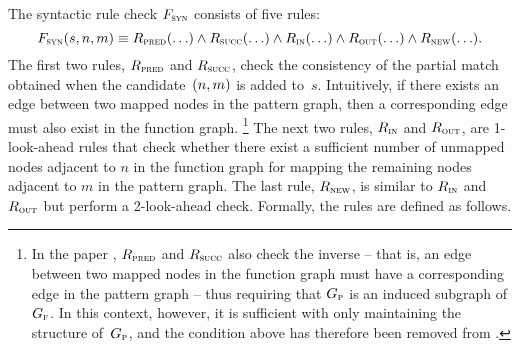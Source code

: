 The syntactic rule check $F_{\textrm{\textsc{syn}}}$ consists of five rules:
%
\begin{equation}
  F_{\textrm{\textsc{syn}}}(s, n, m) \equiv
  R_{\textrm{\textsc{pred}}}(\ldots) \wedge R_{\textrm{\textsc{succ}}}(\ldots) \wedge
  R_{\textrm{\textsc{in}}}(\ldots) \wedge R_{\textrm{\textsc{out}}}(\ldots) \wedge R_{\textrm{\textsc{new}}}(\ldots).
\end{equation}
%
The first two rules, $R_{\textrm{\textsc{pred}}}$ and $R_{\textrm{\textsc{succ}}}$, check the consistency
of the partial \gls{match} obtained when the candidate~\mbox{$\mPair{n}{m}$} is
added to~$s$.
%
Intuitively, if there exists an \gls{edge} between two mapped \glspl{node} in
the \gls{pattern graph}, then a corresponding \gls{edge} must also exist in the
\gls{function graph}.\!%
%
\footnote{%
  In the paper \cite{CordellaEtAl:2001}, $R_{\textrm{\textsc{pred}}}$ and $R_{\textrm{\textsc{succ}}}$
  also check the inverse -- that is, an \gls{edge} between two mapped
  \glspl{node} in the \gls{function graph} must have a corresponding \gls{edge}
  in the \gls{pattern graph} -- thus requiring that $G_{\textrm{\textsc{p}}}$ is an induced
  \gls{subgraph} of $G_{\textrm{\textsc{f}}}$.
  In this context, however, it is sufficient with only maintaining the structure
  of~$G_{\textrm{\textsc{p}}}$, and the condition above has therefore been removed from
  .
}
%
The next two rules, $R_{\textrm{\textsc{in}}}$ and $R_{\textrm{\textsc{out}}}$, are 1-look-ahead rules
that check whether there exist a sufficient number of unmapped \glspl{node}
adjacent to $n$ in the \gls{function graph} for mapping the remaining
\glspl{node} adjacent to $m$ in the \gls{pattern graph}.
%
The last rule, $R_{\textrm{\textsc{new}}}$, is similar to $R_{\textrm{\textsc{in}}}$ and $R_{\textrm{\textsc{out}}}$
but perform a 2-look-ahead check.
%
Formally, the rules are defined as follows.
%
